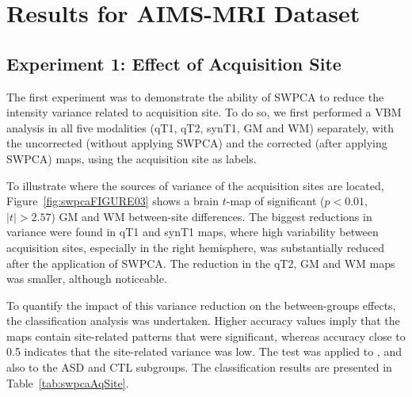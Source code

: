 \section{Results for AIMS-MRI Dataset}\label{sec:swpcaAIMSresults}
 
\subsection{Experiment 1: Effect of Acquisition Site}\label{sec:swpcaE1}
The first experiment was to demonstrate the ability of \ac{SWPCA} to reduce the intensity variance related to acquisition site. To do so, we first performed a \ac{VBM} analysis in all five modalities (\ac{qT1}, \ac{qT2}, \ac{synT1}, \ac{GM} and \ac{WM}) separately, with the uncorrected (without applying \ac{SWPCA}) and the corrected (after applying \ac{SWPCA}) maps, using the acquisition site as labels. 

To illustrate where the sources of variance of the acquisition sites are located, Figure~\ref{fig:swpcaFIGURE03} shows a brain $t$-map of significant ($p<0.01$, $|t|>2.57$) \ac{GM} and \ac{WM} between-site differences. The biggest reductions in variance were found in \ac{qT1} and \ac{synT1} maps, where high variability between acquisition sites, especially in the right hemisphere, was substantially reduced after the application of \ac{SWPCA}. The reduction in the \ac{qT2}, \ac{GM} and \ac{WM} maps was smaller, although noticeable. 

To quantify the impact of this variance reduction on the between-groups effects, the classification analysis was undertaken. Higher accuracy values imply that the maps contain site-related patterns that were significant, whereas accuracy close to 0.5 indicates that the site-related variance was low. The test was applied to \all{}, and also to the \ac{ASD} and \ac{CTL} subgroups. The classification results are presented in Table~\ref{tab:swpcaAqSite}. 
	
